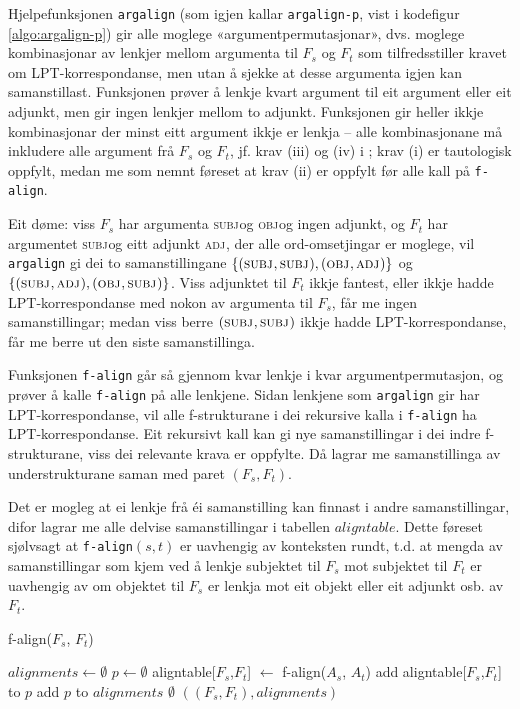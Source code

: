 \documentclass[11pt,a4paper,oneside,draft]{book}
\newcommand{\F}[2]{\textsc{#1}\ensuremath{_{#2}}}
\newcommand{\OBJ}{\F{obj}{}}
\newcommand{\ADJ}{\F{adj}{}}
\newcommand{\SUBJ}{\F{subj}{}}
\begin{document}
Hjelpefunksjonen \texttt{argalign} (som igjen kallar \texttt{argalign-p}, vist i
kodefigur \ref{algo:argalign-p}) gir alle moglege
«argumentpermutasjonar», dvs. moglege kombinasjonar av lenkjer mellom
argumenta til $F_s$ og $F_t$ som tilfredsstiller kravet om
LPT-korrespondanse, men utan å sjekke at desse argumenta igjen kan
samanstillast. Funksjonen prøver å lenkje kvart argument til eit
argument eller eit adjunkt, men gir ingen lenkjer mellom to
adjunkt. Funksjonen gir heller ikkje kombinasjonar der minst eitt
argument ikkje er lenkja -- alle kombinasjonane må inkludere alle
argument frå $F_s$ og $F_t$, jf. krav (iii) og (iv) i
\citet[s.~75]{dyvik2009lmp}; krav (i) er tautologisk oppfylt, medan me
som nemnt føreset at krav (ii) er oppfylt før alle kall på \texttt{f-align}.

Eit døme: viss $F_s$ har argumenta \SUBJ og \OBJ og ingen adjunkt, og
$F_t$ har argumentet \SUBJ og eitt adjunkt \ADJ, der alle
ord-omsetjingar er moglege, vil \texttt{argalign} gi dei to samanstillingane
$\{(\SUBJ,\SUBJ), (\OBJ,\ADJ)\}$ og $\{(\SUBJ,\ADJ),
(\OBJ,\SUBJ)\}$. Viss adjunktet til $F_t$ ikkje fantest, eller ikkje
hadde LPT-korrespondanse med nokon av argumenta til $F_s$, får me
ingen samanstillingar; medan viss berre $(\SUBJ,\SUBJ)$ ikkje hadde
LPT-korrespondanse, får me berre ut den siste samanstillinga.

Funksjonen \texttt{f-align} går så gjennom kvar lenkje i kvar
argumentpermutasjon, og prøver å kalle \texttt{f-align} på alle
lenkjene. Sidan lenkjene som \texttt{argalign} gir har LPT-korrespondanse,
vil alle f-strukturane i dei rekursive kalla i \texttt{f-align} ha
LPT-korrespondanse. Eit rekursivt kall kan gi nye samanstillingar i
dei indre f-strukturane, viss dei relevante krava er oppfylte. Då
lagrar me samanstillinga av understrukturane saman med paret
$(F_s,F_t)$.

Det er mogleg at ei lenkje frå éi samanstilling kan finnast i andre
samanstillingar, difor lagrar me alle delvise samanstillingar i
tabellen $aligntable$. Dette føreset sjølvsagt at
\texttt{f-align}$(s,t)$ er uavhengig av konteksten rundt, t.d. at
mengda av samanstillingar som kjem ved å lenkje subjektet til $F_s$
mot subjektet til $F_t$ er uavhengig av om objektet til $F_s$ er
lenkja mot eit objekt eller eit adjunkt osb. av $F_t$. 


     \begin{algorithm}[]
      \caption{f-align($F_s$, $F_t$)}
      \label{algo:f-align}
      
      $alignments \gets \emptyset$  \;
       {
        $p \gets \emptyset$ \;
          {
            {
           aligntable[$F_s$,$F_t$] $\gets$ f-align($A_s$, $A_t$)\;
           }
          add aligntable[$F_s$,$F_t$] to $p$\;
        }
        add $p$ to $alignments$ \;
       }
        \Return $\emptyset$ 
       \lElse \Return $((F_s, F_t), alignments)$ \;
       \end{algorithm}    
    
\end{document}
